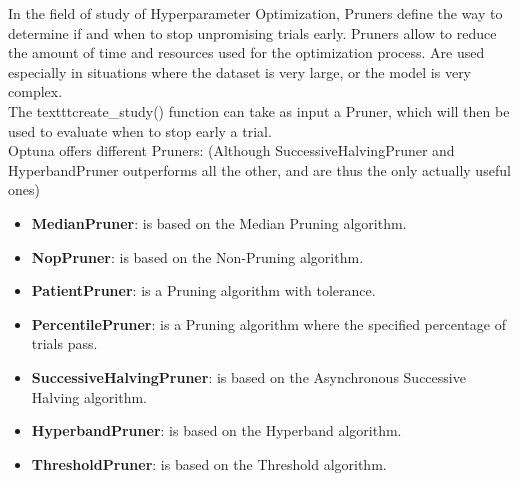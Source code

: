 In the field of study of Hyperparameter Optimization, Pruners define the way to determine if and when to stop unpromising trials early.
Pruners allow to reduce the amount of time and resources used for the optimization process. Are used especially in situations where the dataset is very large, or the model is very complex.
\\[0.3cm]The texttt{create\_study()} function can take as input a Pruner, which will then be used to evaluate when to stop early a trial.
\\[0.3cm]Optuna offers different Pruners: (Although SuccessiveHalvingPruner and HyperbandPruner outperforms all the other, and are thus the only actually useful ones)
% 
\begin{itemize}
	\item \textbf{MedianPruner}: is based on the Median Pruning algorithm.
	\item \textbf{NopPruner}: is based on the Non-Pruning algorithm.
	\item \textbf{PatientPruner}: is a Pruning algorithm with tolerance.
	\item \textbf{PercentilePruner}: is a Pruning algorithm where the specified percentage of trials pass.
	\item \textbf{SuccessiveHalvingPruner}: is based on the Asynchronous Successive Halving algorithm. \cite{OptunaPruners-SuccessiveHalvingAlgorithm} \cite{OptunaPruners-AsynchronousSuccessiveHalvingAlgorithm}
	\item \textbf{HyperbandPruner}: is based on the Hyperband algorithm. \cite{OptunaPruners-Hyperband}
	\item \textbf{ThresholdPruner}: is based on the Threshold algorithm.
\end{itemize}
% 





